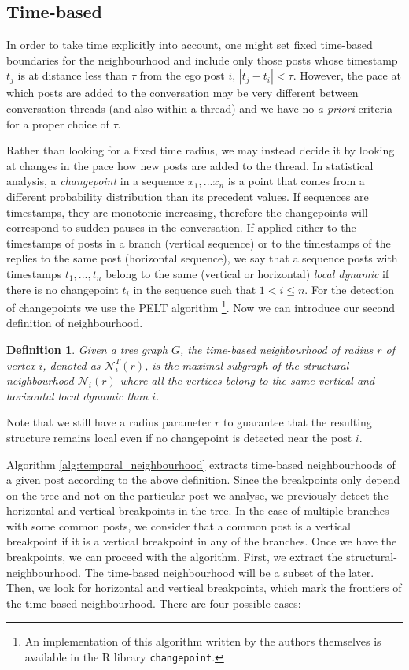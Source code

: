 \documentclass[conference]{IEEEtran}
\newtheorem{definition}{Definition}
\begin{document}
\subsection{Time-based}
In order to take time explicitly into account, one might set fixed time-based boundaries for the neighbourhood and include only those posts whose timestamp $t_j$ is at distance less than $\tau$ from the ego post $i$, $|t_j-t_i|<\tau$. However, the pace at which posts are added to the conversation may be very different between conversation threads (and also within a thread) and we have no \textit{a priori} criteria for a proper choice of $\tau$. 

Rather than looking for a fixed time radius, we may instead decide it by looking at changes in the pace how new posts are added to the thread. In statistical analysis, a \textit{changepoint} in a sequence $x_1,...x_n$ is a point that comes from a different probability distribution than its precedent values. If sequences are timestamps, they are monotonic increasing, therefore the changepoints will correspond to sudden pauses in the conversation. If applied either to the timestamps of posts in a branch (vertical sequence) or to the timestamps of the replies to the same post (horizontal sequence), we say that a sequence posts with timestamps $t_1,...,t_n$ belong to the same (vertical or horizontal) \textit{local dynamic} if there is no changepoint $t_i$ in the sequence such that $1 < i \leq n$. For the detection of changepoints we use the PELT algorithm \cite{Killick2012}\footnote{An implementation of this algorithm written by the authors themselves is available in the R library \texttt{changepoint}.}. Now we can introduce our second definition of neighbourhood.
\begin{definition}
Given a tree graph $G$, the \textit{time-based neighbourhood} of radius $r$ of vertex $i$, denoted as $\mathcal{N}_{i}^T(r)$, is the maximal subgraph of the structural neighbourhood $\mathcal{N}_i(r)$ where all the vertices  belong to the same vertical and horizontal local dynamic than $i$.
\end{definition}
Note that we still have a radius parameter $r$ to guarantee that the resulting structure remains local even if no changepoint is detected near the post $i$. 

Algorithm \ref{alg:temporal_neighbourhood} extracts time-based neighbourhoods of a given post according to the above definition. Since the breakpoints only depend on the tree and not on the particular post we analyse, we previously detect the horizontal and vertical breakpoints in the tree. In the case of multiple branches with some common posts, we consider that a common post is a vertical breakpoint if it is a vertical breakpoint in any of the branches. Once we have the breakpoints, we can proceed with the algorithm. First, we extract the structural-neighbourhood. The time-based neighbourhood will be a subset of the later. Then, we look for horizontal and vertical breakpoints, which mark the frontiers of the time-based neighbourhood. There are four possible cases:
\end{document}
